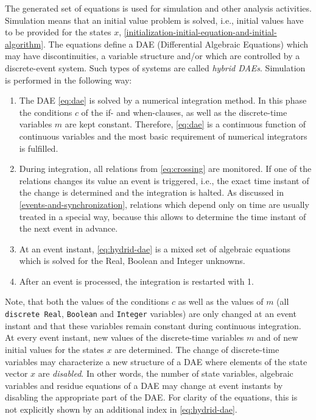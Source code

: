 The generated set of equations is used for simulation and other analysis
activities. Simulation means that an initial value problem is solved,
i.e., initial values have to be provided for the states $x$, \cref{initialization-initial-equation-and-initial-algorithm}.
The equations define a DAE (Differential Algebraic Equations) which may
have discontinuities, a variable structure and/or which are controlled
by a discrete-event system. Such types of systems are called
\emph{hybrid DAEs}. Simulation is performed in the following way:
\begin{enumerate}
\item
  The DAE \eqref{eq:dae} is solved by a numerical integration method. In this
  phase the conditions $c$ of the if- and when-clauses, as well as the
  discrete-time variables $m$ are kept constant. Therefore, \eqref{eq:dae} is a
  continuous function of continuous variables and the most basic
  requirement of numerical integrators is fulfilled.
\item
  During integration, all relations from \eqref{eq:crossing} are monitored. If one of
  the relations changes its value an event is triggered, i.e., the exact
  time instant of the change is determined and the integration is
  halted. As discussed in \cref{events-and-synchronization}, relations which depend only on
  time are usually treated in a special way, because this allows to
  determine the time instant of the next event in advance.
\item
  At an event instant, \eqref{eq:hydrid-dae} is a mixed set of algebraic equations which
  is solved for the Real, Boolean and Integer unknowns.
\item
  After an event is processed, the integration is restarted with 1.
\end{enumerate}

Note, that both the values of the conditions $c$ as well as the values of
$m$ (all \lstinline!discrete Real!, \lstinline!Boolean! and \lstinline!Integer! variables) are only changed at
an event instant and that these variables remain constant during
continuous integration. At every event instant, new values of the
discrete-time variables $m$ and of new initial values for the states $x$ are
determined. The change of discrete-time variables may characterize a new
structure of a DAE where elements of the state vector $x$ are
\emph{disabled}. In other words, the number of state variables,
algebraic variables and residue equations of a DAE may change at event
instants by disabling the appropriate part of the DAE. For clarity of
the equations, this is not explicitly shown by an additional index in
\eqref{eq:hydrid-dae}.

